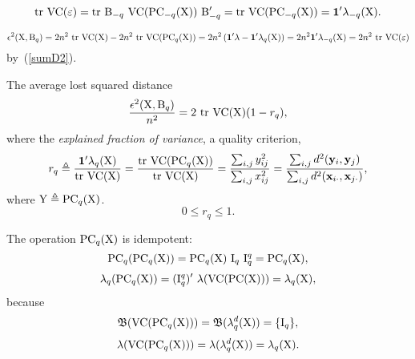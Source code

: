 \documentclass[10pt,a4paper]{article}
\theoremstyle{plain} \newtheorem{Lem}{Lemma}
\begin{document}
$$ \mathrm {tr} \  \mathrm {VC} (\mathrm \varepsilon) = \mathrm {tr} \  \mathrm B_{-q} \ \mathrm {VC}(\mathrm {PC}_{-q}(\mathrm X)) \ \mathrm B_{-q}' = \mathrm {tr} \  \mathrm {VC}(\mathrm {PC}_{-q}(\mathrm X)) = \mathbf 1' \mathbf \lambda_{-q}(\mathrm X). $$

$$ \epsilon^2(\mat X, \mat B_q) = 2n^2 \ \trc \VC (\mat X) - 2n^2 \ \trc \VC (\PC_q(\mat X))
  = 2n^2 \left(\ve 1' \ve \lambda - \ve 1' \ve \lambda_q(\mat X) \right)
  = 2n^2 \ve 1' \ve \lambda_{-q}(\mat X)
  = 2n^2 \ \trc \VC (\mat \varepsilon)
$$
by~(\ref{sumD2}).

The average lost squared distance
$$ \frac {\epsilon^2(\mathrm X, \mathrm B_q)} {n^2} = 2 \ \mathrm {tr} \  \mathrm {VC} (\mathrm X) (1 - r_q), $$
where the {\em explained fraction of variance}, a quality criterion,
\begin{equation}\label{explFracVar}
r_q \triangleq \frac {\mathbf 1' \mathbf \lambda_q(\mathrm X)} {\mathrm {tr} \  \mathrm {VC} (\mathrm X)}
  = \frac {\mathrm {tr} \  \mathrm {VC} (\mathrm {PC}_q(\mathrm X))} {\mathrm {tr} \  \mathrm {VC} (\mathrm X)}
  = \frac {\sum_{i,j} y^2_{ij}} {\sum_{i,j} x^2_{ij}}
  = \frac {\sum_{i,j} d^2(\mathbf y_i, \mathbf y_j)} {\sum_{i,j} d^2(\mathbf x_{i\cdot}, \mathbf x_{j\cdot})},
\end{equation}
where $\mathrm Y \triangleq \mathrm {PC}_q(\mathrm X)$.
$$ 0 \le r_q \le 1. $$


The operation $\mathrm {PC}_q(\mathrm X)$ is idempotent:
$$ \mathrm {PC}_q(\mathrm {PC}_q(\mathrm X)) = \mathrm {PC}_q (\mathrm X) \ \mathrm I_q \ \mathrm I^q_q = \mathrm {PC}_q(\mathrm X), $$
$$ \ve \lambda_q (\PC_q(\mat X)) = (\mat I^q_q)' \ \ve \lambda(\VC(\PC(\mat X))) = \ve \lambda_q(\mat X), $$
because
$$ \mathfrak B(\mathrm {VC}(\mathrm {PC}_q(\mathrm X))) = \mathfrak B(\mathbf \lambda_q^d(\mathrm X)) = \{\mathrm I_q \}, $$
$$ \mathbf \lambda(\mathrm {VC}(\mathrm {PC}_q(\mathrm X))) =  \mathbf \lambda(\mathbf \lambda_q^d(\mathrm X)) = \mathbf \lambda_q(\mathrm X). $$
\end{document}
